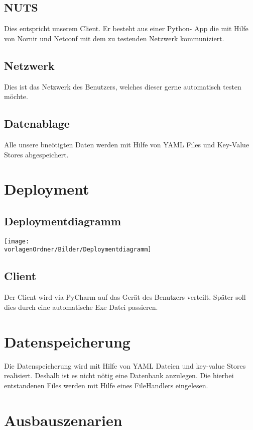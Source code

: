 \documentclass[
	ngerman,
	toc=listof, %
	toc=bibliography, %
	footnotes=multiple, %
	parskip=half, %
	numbers=noendperiod %
]{scrartcl}
\newcommand{\vorlagenOrdner}{../../99_Vorlagen} %
\begin{document}
	\subsection{NUTS}
		Dies entspricht unserem Client. Er besteht aus einer Python- App die mit Hilfe von Nornir und Netconf mit dem zu testenden Netzwerk kommuniziert.

	\subsection{Netzwerk}
		Dies ist das Netzwerk des Benutzers, welches dieser gerne automatisch testen möchte.

	\subsection{Datenablage}
		Alle unsere bneötigten Daten werden mit Hilfe von YAML Files und Key-Value Stores abgespeichert. 

\section{Deployment}
	\subsection{Deploymentdiagramm}
		\texttt{[image: \\vorlagenOrdner/Bilder/Deploymentdiagramm]}
	\subsection{Client}
		Der Client wird via PyCharm auf das Gerät des Benutzers verteilt. Später soll dies durch eine automatische Exe Datei passieren.

\section{Datenspeicherung}
	Die Datenspeicherung wird mit Hilfe von YAML Dateien und key-value Stores realisiert. Deshalb ist es nicht nötig eine Datenbank anzulegen. Die hierbei entstandenen Files werden mit Hilfe eines FileHandlers eingelesen.

\section{Ausbauszenarien}
	
\end{document}

